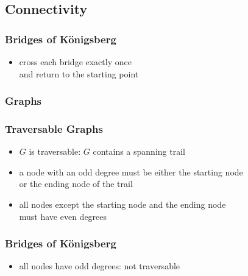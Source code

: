\documentclass[dvipsnames]{beamer}
\begin{document}
\subsection{Connectivity}

\begin{frame}
  \frametitle{Bridges of Königsberg}

  \begin{center}
  \end{center}

  \begin{itemize}
    \item cross each bridge exactly once\\
      and return to the starting point
  \end{itemize}
\end{frame}

\begin{frame}
  \frametitle{Graphs}

  \begin{center}
  \end{center}
\end{frame}

\begin{frame}
  \frametitle{Traversable Graphs}

  \begin{itemize}
    \item $G$ is \alert{traversable}: $G$ contains a spanning trail

    \medskip
    \item a node with an odd degree must be either the starting node\\
      or the ending node of the trail
    \item all nodes except the starting node and the ending node\\
      must have even degrees
  \end{itemize}
\end{frame}

\begin{frame}
  \frametitle{Bridges of Königsberg}

  \begin{center}
  \end{center}

  \begin{itemize}
    \item all nodes have odd degrees: not traversable
  \end{itemize}
\end{frame}
\end{document}
